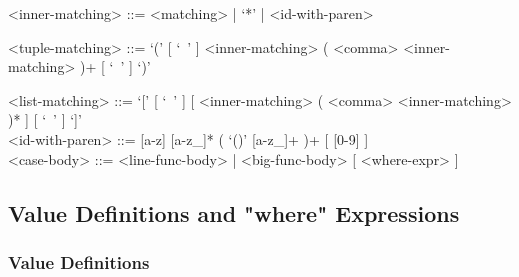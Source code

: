 \documentclass{article}
\begin{document}
\begin{itemize}
\begin{grammar}
<inner-matching> ::= <matching> | `*' | <id-with-paren>

<tuple-matching> ::=
`(' [ `\ ' ] <inner-matching> ( <comma> <inner-matching> )+ [ `\ ' ] `)'

<list-matching> ::=
`[' [ `\ ' ] [ <inner-matching> ( <comma> <inner-matching> )* ] [ `\ ' ]
`]'
\\

<id-with-paren> ::= [a-z] [a-z_]* ( `()' [a-z_]+ )+ [ [0-9] ]
\\

<case-body> ::= <line-func-body> | <big-func-body> [ <where-expr> ]
\end{grammar}

\end{itemize}

\newpage

\subsection{Value Definitions and "where" Expressions}
\label{subsec:valdefswhere}

\subsubsection{Value Definitions}
\label{subsubsec:valdefs}
\end{document}
